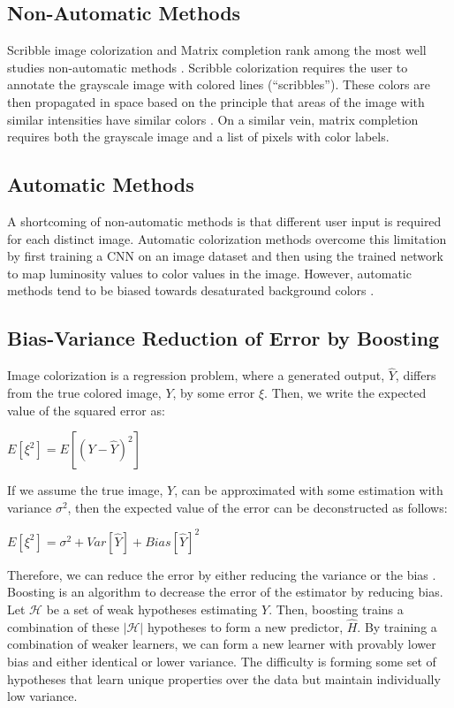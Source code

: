 \documentclass[10pt,twocolumn,letterpaper]{article}
\begin{document}
\subsection{Non-Automatic Methods}
Scribble image colorization and Matrix completion rank among the most well studies non-automatic methods \cite{Charpiat2010,Levin2004,Charpiat2008}. Scribble colorization requires the user to annotate the grayscale image with colored lines (“scribbles”). These colors are then propagated in space based on the principle that areas of the image with similar intensities have similar colors \cite{Levin2004}. On a similar vein, matrix completion requires both the grayscale image and a list of pixels with color labels.

\subsection{Automatic Methods}
A shortcoming of non-automatic methods is that different user input is required for each distinct image. Automatic colorization methods overcome this limitation by first training a CNN on an image dataset and then using the trained network to map luminosity values to color values in the image. However, automatic methods tend to be biased towards desaturated background colors \cite{Charpiat2008}.

\subsection{Bias-Variance Reduction of Error by Boosting}
Image colorization is a regression problem, where a generated output, $\hat{Y}$, differs from the true colored image, $Y$, by some error $\xi$. Then, we write the expected value of the squared error as:\newline

$E[\xi^2] = E[(Y-\hat{Y})^2]$ \newline

If we assume the true image, $Y$, can be approximated with some estimation with variance $\sigma^2$, then the expected value of the error can be deconstructed as follows\cite{BiasVar}: \newline

$E[\xi^2] = \sigma^2 + Var[\hat{Y}] + Bias[\hat{Y}]^2$ \newline

Therefore, we can reduce the error by either reducing the variance or the bias \cite{BiasVar}. Boosting is an algorithm to decrease the error of the estimator by reducing bias. Let $\mathcal{H}$ be a set of weak hypotheses estimating $Y$. Then, boosting trains a combination of these $|\mathcal{H}|$ hypotheses to form a new predictor, $\hat{H}$. By training a combination of weaker learners, we can form a new learner with provably lower bias and either identical or lower variance. The difficulty is forming some set of hypotheses that learn unique properties over the data but maintain individually low variance.
\end{document}
